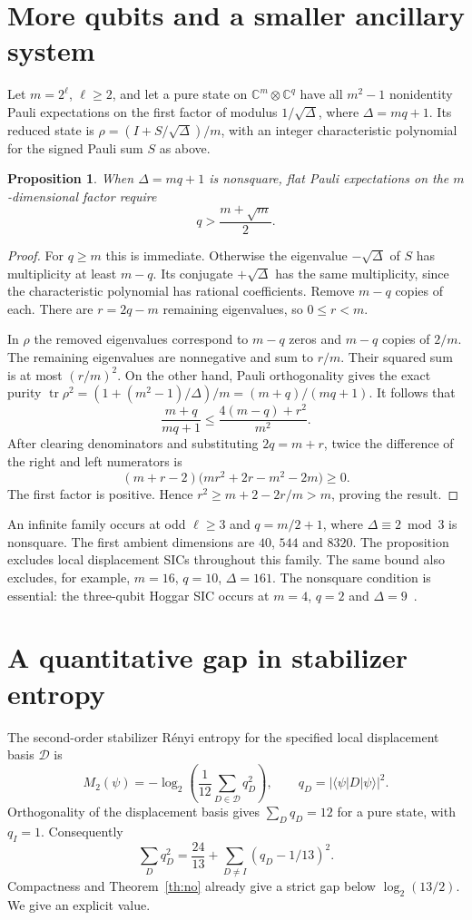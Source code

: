 \documentclass[11pt]{article}
\newtheorem{proposition}[theorem]{Proposition}
\newcommand{\CC}{\mathbb C}\newcommand{\ZZ}{\mathbb Z}\newcommand{\RR}{\mathbb R}
\newcommand{\tr}{\operatorname{tr}}\newcommand{\rank}{\operatorname{rank}}
\begin{document}
\section{More qubits and a smaller ancillary system}

Let $m=2^\ell$, $\ell\ge2$, and let a pure state on $\CC^m\otimes\CC^q$ have all $m^2-1$ nonidentity Pauli expectations on the first factor of modulus $1/\sqrt{\Delta}$, where $\Delta=mq+1$. Its reduced state is $\rho=(I+S/\sqrt{\Delta})/m$, with an integer characteristic polynomial for the signed Pauli sum $S$ as above.

\begin{proposition}\label{prop:family}
When $\Delta=mq+1$ is nonsquare, flat Pauli expectations on the $m$-dimensional factor require
\[
                         q>\frac{m+\sqrt m}{2}.
\]
\end{proposition}
\begin{proof}
For $q\ge m$ this is immediate. Otherwise the eigenvalue $-\sqrt{\Delta}$ of $S$ has multiplicity at least $m-q$. Its conjugate $+\sqrt{\Delta}$ has the same multiplicity, since the characteristic polynomial has rational coefficients. Remove $m-q$ copies of each. There are $r=2q-m$ remaining eigenvalues, so $0\le r<m$.

In $\rho$ the removed eigenvalues correspond to $m-q$ zeros and $m-q$ copies of $2/m$. The remaining eigenvalues are nonnegative and sum to $r/m$. Their squared sum is at most $(r/m)^2$. On the other hand, Pauli orthogonality gives the exact purity $\tr\rho^2=(1+(m^2-1)/\Delta)/m=(m+q)/(mq+1)$. It follows that
\[
 \frac{m+q}{mq+1}\leq\frac{4(m-q)+r^2}{m^2}.
\]
After clearing denominators and substituting $2q=m+r$, twice the difference of the right and left numerators is
\[
                 (m+r-2)\bigl(mr^2+2r-m^2-2m\bigr)\geq0 .
\]
The first factor is positive. Hence $r^2\ge m+2-2r/m>m$, proving the result.
\end{proof}
An infinite family occurs at odd $\ell\ge3$ and $q=m/2+1$, where $\Delta\equiv2\bmod3$ is nonsquare. The first ambient dimensions are $40$, $544$ and $8320$. The proposition excludes local displacement SICs throughout this family. The same bound also excludes, for example, $m=16$, $q=10$, $\Delta=161$. The nonsquare condition is essential: the three-qubit Hoggar SIC occurs at $m=4$, $q=2$ and $\Delta=9$~\cite{review}.

\section{A quantitative gap in stabilizer entropy}
The second-order stabilizer R\'enyi entropy for the specified local displacement basis $\mathcal D$ is~\cite{banacki,cuffaro}
\[
 M_2(\psi)=-\log_2\left(\frac1{12}\sum_{D\in\mathcal D} q_D^2\right),
 \qquad q_D=|\langle\psi|D|\psi\rangle|^2 .
\]
Orthogonality of the displacement basis gives $\sum_Dq_D=12$ for a pure state, with $q_I=1$. Consequently
\begin{equation}
    \sum_D q_D^2=\frac{24}{13}+\sum_{D\ne I}(q_D-1/13)^2 . \label{eq:deficit}
\end{equation}
Compactness and Theorem~\ref{th:no} already give a strict gap below $\log_2(13/2)$. We give an explicit value.
\end{document}
